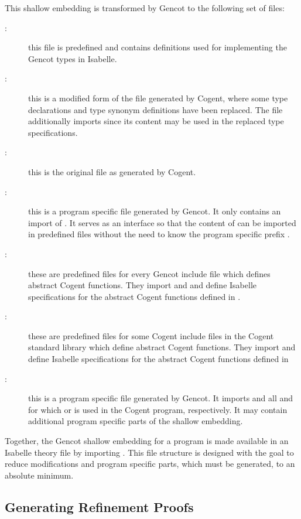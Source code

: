 This shallow embedding is transformed by Gencot to the following set of files:
\begin{description}
\item[:] this file is predefined and contains definitions used for implementing the Gencot 
types in Isabelle.
\item[:] this is a modified form of the file generated by Cogent, where some type 
declarations and type synonym definitions have been replaced. The file additionally imports 
since its content may be used in the replaced type specifications.
\item[:] this is the original file as generated by Cogent.
\item[:] this is a program specific file generated by Gencot. It only contains an import of 
. It serves as an interface so that the content of  can be
imported in predefined files without the need to know the program specific prefix .
\item[:] these are predefined files for every Gencot include file  which defines
abstract Cogent functions. They import  and  and define Isabelle
specifications for the abstract Cogent functions defined in .
\item[:] these are predefined files for some Cogent include files  in the 
Cogent standard library  which define abstract Cogent functions. They import 
and define Isabelle specifications for the abstract Cogent functions defined in 
\item[:] this is a program specific file generated by Gencot. It imports 
 and all  and  for which 
or  is used in the Cogent program, respectively. It may contain additional program specific parts
of the shallow embedding. 
\end{description}

Together, the Gencot shallow embedding for a program  is made available in an Isabelle theory file by importing
. This file structure is designed with the goal to reduce modifications and program 
specific parts, which must be generated, to an absolute minimum.

\subsection{Generating Refinement Proofs}
\label{impl-isabelle-refine}

